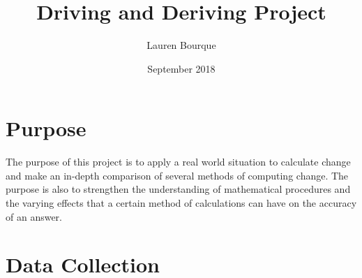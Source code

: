 \documentclass[12 pt]{article}
\title{Driving and Deriving Project}
\author{Lauren Bourque }
\date{September 2018}
\begin{document}
\maketitle
\section{Purpose}
The purpose of this project is to apply a real world situation to calculate change and make an in-depth comparison of several methods of computing change. The purpose is also to strengthen the understanding of mathematical procedures and the varying effects that a certain method of calculations can have on the accuracy of an answer.
\section{Data Collection}
\end{document}
